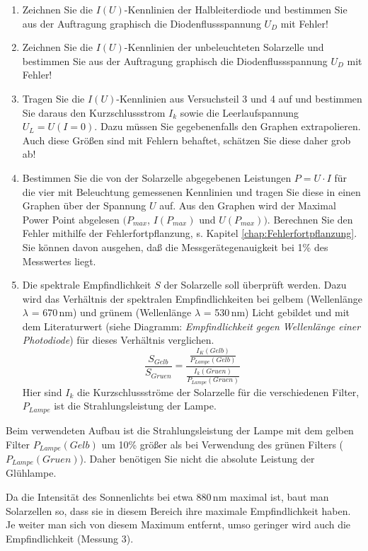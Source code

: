 \begin{enumerate}
	\item Zeichnen Sie die $I(U)$-Kennlinien der Halbleiterdiode und bestimmen Sie aus der Auftragung graphisch die Diodenflussspannung $U_D$ mit Fehler!
	\item Zeichnen Sie die $I(U)$-Kennlinien der unbeleuchteten Solarzelle und bestimmen Sie aus der Auftragung graphisch die Diodenflussspannung $U_D$ mit Fehler!
	\item Tragen Sie die $I(U)$-Kennlinien aus Versuchsteil 3 und 4 auf und bestimmen Sie daraus den Kurzschlussstrom $I_k$ sowie die Leerlaufspannung $U_L = U (I = 0)$. Dazu müssen Sie gegebenenfalls den Graphen extrapolieren. 	
		Auch diese Größen sind mit Fehlern behaftet, schätzen Sie diese daher grob ab!
	\item Bestimmen Sie die von der Solarzelle abgegebenen Leistungen $P = U \cdot I$ für die vier mit Beleuchtung gemessenen Kennlinien und tragen Sie diese in einen Graphen über der Spannung $U$ auf. Aus den Graphen wird der Maximal Power Point abgelesen $(P_{max}$, $I(P_{max})$ und $U(P_{max}))$. Berechnen Sie den Fehler mithilfe der Fehlerfortpflanzung, s. Kapitel \ref{chap:Fehlerfortpflanzung}. Sie können davon ausgehen, daß die Messgerätegenauigkeit bei 1\% des Messwertes liegt.
	\item Die spektrale Empfindlichkeit $S$ der Solarzelle soll überprüft werden. Dazu wird das Verhältnis der spektralen Empfindlichkeiten bei gelbem (Wellenlänge $\lambda$ = 670\,nm) und grünem (Wellenlänge $\lambda$ = 530\,nm) Licht gebildet und mit dem Literaturwert (siehe Diagramm: \textit{Empfindlichkeit gegen Wellenlänge einer Photodiode}) für dieses Verhältnis verglichen.
		\begin{equation}
			\frac{S_{Gelb}}{S_{Gruen}}=\frac{\frac{I_K(Gelb)}{P_{Lampe}(Gelb)}}{\frac{I_k(Gruen)}{P_{Lampe}(Gruen)}}
		\end{equation}
		Hier sind $I_k$ die Kurzschlussströme der Solarzelle für die verschiedenen Filter, $P_{Lampe}$ ist die Strahlungsleistung der Lampe.
\end{enumerate}
Beim verwendeten Aufbau ist die Strahlungsleistung der Lampe mit dem gelben Filter $P_{Lampe}(Gelb)$ um 10\% größer als bei Verwendung des grünen Filters ($P_{Lampe}(Gruen)$). Daher benötigen Sie nicht die absolute Leistung der Glühlampe.

\noindent
Da die Intensität des Sonnenlichts bei etwa 880\,nm maximal ist, baut man Solarzellen so, dass sie in diesem Bereich ihre maximale Empfindlichkeit haben. Je weiter man sich von diesem Maximum entfernt, umso geringer wird auch die Empfindlichkeit (Messung 3).

